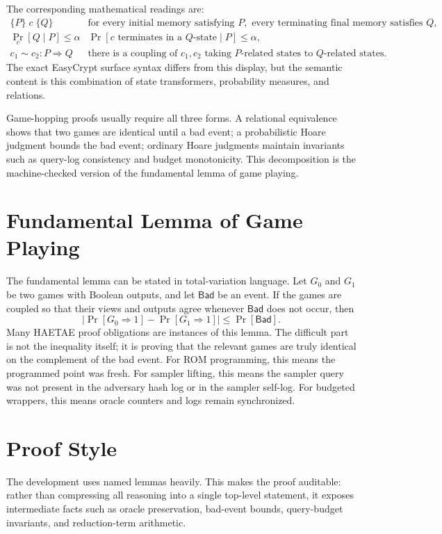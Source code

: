 The corresponding mathematical readings are:
\[
\begin{array}{ll}
\{P\}\;c\;\{Q\}
&
\text{for every initial memory satisfying }P,\text{ every terminating final memory satisfies }Q,\\[0.4em]
\Pr_c[Q\mid P]\le \alpha
&
\Pr[c\text{ terminates in a }Q\text{-state}\mid P]\le \alpha,\\[0.4em]
c_1 \sim c_2 : P \Longrightarrow Q
&
\text{there is a coupling of }c_1,c_2\text{ taking }P\text{-related states to }Q\text{-related states}.
\end{array}
\]
The exact EasyCrypt surface syntax differs from this display, but the semantic
content is this combination of state transformers, probability measures, and
relations.

Game-hopping proofs usually require all three forms.  A relational equivalence
shows that two games are identical until a bad event; a probabilistic Hoare
judgment bounds the bad event; ordinary Hoare judgments maintain invariants such
as query-log consistency and budget monotonicity.  This decomposition is the
machine-checked version of the fundamental lemma of game playing.

\section{Fundamental Lemma of Game Playing}

The fundamental lemma can be stated in total-variation language.  Let \(G_0\)
and \(G_1\) be two games with Boolean outputs, and let \(\mathsf{Bad}\) be an
event.  If the games are coupled so that their views and outputs agree whenever
\(\mathsf{Bad}\) does not occur, then
\[
  \left|\Pr[G_0\Rightarrow 1]-\Pr[G_1\Rightarrow 1]\right|
  \le \Pr[\mathsf{Bad}].
\]
Many HAETAE proof obligations are instances of this lemma.  The difficult part
is not the inequality itself; it is proving that the relevant games are truly
identical on the complement of the bad event.  For ROM programming, this means
the programmed point was fresh.  For sampler lifting, this means the sampler
query was not present in the adversary hash log or in the sampler self-log.  For
budgeted wrappers, this means oracle counters and logs remain synchronized.

\section{Proof Style}

The development uses named lemmas heavily.  This makes the proof auditable:
rather than compressing all reasoning into a single top-level statement, it exposes
intermediate facts such as oracle preservation, bad-event bounds, query-budget
invariants, and reduction-term arithmetic.

